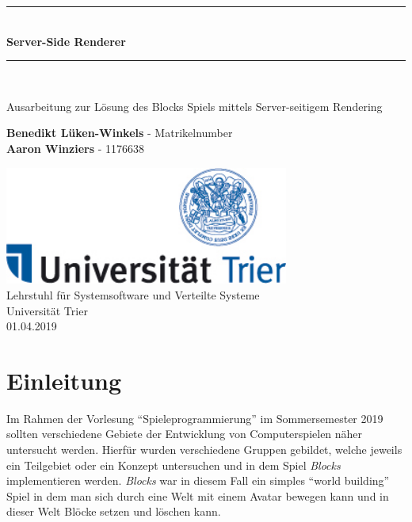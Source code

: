 \documentclass[11pt,parskip=full]{scrartcl}
\newcommand{\HRule}[1]{\rule{\linewidth}{#1}}
\begin{document}
\begin{titlepage}
  \begin{center}
    \vspace*{2cm}
    \HRule{1pt} \\
    \vspace{.5 cm}
    \textbf{\Huge Server-Side Renderer}
    \HRule{2pt} \\ [1cm]

    \vspace{1.5cm}

    \Large{
      Ausarbeitung zur Lösung des Blocks Spiels mittels Server-seitigem Rendering
    }
    \vspace{1.5cm}

    \textbf{\Large Benedikt Lüken-Winkels} - \large Matrikelnumber \\
    [3pt]
    \textbf{\Large Aaron Winziers} - \large 1176638

    \vfill

    \includegraphics[width=0.7\textwidth]{Logo-Uni-Trier}\\
    [1cm]
    Lehrstuhl für Systemsoftware und Verteilte Systeme\\
    Universität Trier\\
    01.04.2019

  \end{center}
\end{titlepage}
\newpage

\section{Einleitung}

Im Rahmen der Vorlesung ``Spieleprogrammierung'' im Sommersemester 2019 sollten verschiedene Gebiete der Entwicklung von Computerspielen näher untersucht werden. Hierfür wurden verschiedene Gruppen gebildet, welche jeweils ein Teilgebiet oder ein Konzept untersuchen und in dem Spiel \textit{Blocks} implementieren werden. \textit{Blocks} war in diesem Fall ein simples ``world building'' Spiel in dem man sich durch eine Welt mit einem Avatar bewegen kann und in dieser Welt Blöcke setzen und löschen kann.
\end{document}
